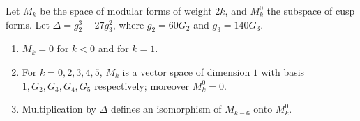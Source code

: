 Let $M_k$ be the space of modular forms of weight $2k$, and $M_k^0$ the subspace of cusp forms. Let $\Delta = g_2^3 - 27 g_3^2$, where $g_2 = 60 G_2$ and $g_3 = 140 G_3$.

\begin{enumerate}
\item[(i)] $M_k = 0$ for $k < 0$ and for $k = 1$.
\item[(ii)] For $k = 0, 2, 3, 4, 5$, $M_k$ is a vector space of dimension $1$ with basis $1, G_2, G_3, G_4, G_5$ respectively; moreover $M_k^0 = 0$.
\item[(iii)] Multiplication by $\Delta$ defines an isomorphism of $M_{k-6}$ onto $M_k^0$.
\end{enumerate}
